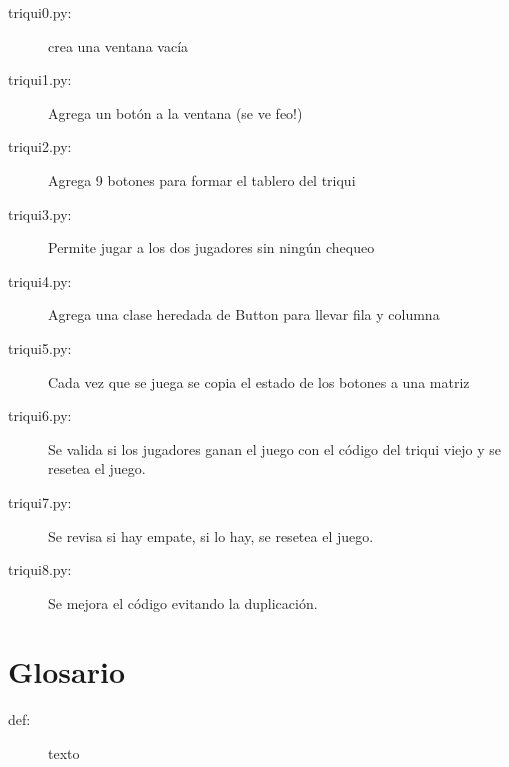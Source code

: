 \begin{description}

\item[triqui0.py:] crea una ventana vacía
\item[triqui1.py:] Agrega un botón a la ventana (se ve feo!)
\item[triqui2.py:] Agrega 9 botones para formar el tablero del triqui
\item[triqui3.py:] Permite jugar a los dos jugadores sin ningún chequeo
\item[triqui4.py:] Agrega una clase heredada de Button para llevar fila y columna 
\item[triqui5.py:] Cada vez que se juega se copia el estado de los botones a una matriz
\item[triqui6.py:] Se valida si los jugadores ganan el juego con el código del triqui viejo
	    y se resetea el juego.
\item[triqui7.py:] Se revisa si hay empate, si lo hay, se resetea el juego.
\item[triqui8.py:] Se mejora el código evitando la duplicación.
\end{description}

\section{Glosario}

\begin{description}

\item[def:] texto




\end{description}
